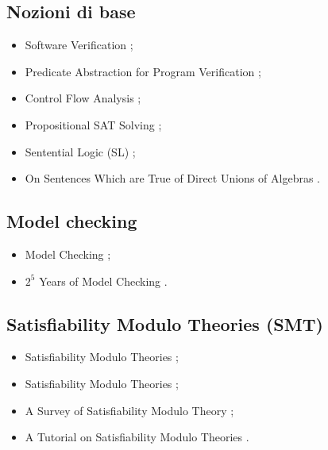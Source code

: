 \subsection*{Nozioni di base}
\begin{itemize}

\item Software Verification \cite{kroening2021softver};

\item Predicate Abstraction for Program Verification \cite{jhala2018predver};

\item Control Flow Analysis \cite{allen1970cfa};

\item Propositional SAT Solving \cite{marquessilva2018sat};

\item Sentential Logic (SL) \cite{polkowski2023sl};

\item On Sentences Which are True of Direct Unions of Algebras \cite{horn1951clause}.

\end{itemize}

\subsection*{Model checking}
\begin{itemize}

\item Model Checking \cite{clarke1997modelcheck};

\item $2^5$ Years of Model Checking \cite{clarke2014modelcheck}.

\end{itemize}

\subsection*{Satisfiability Modulo Theories (SMT)}
\begin{itemize}

\item Satisfiability Modulo Theories \cite{barrett2021smt};

\item Satisfiability Modulo Theories \cite{barrett2018smt};

\item A Survey of Satisfiability Modulo Theory \cite{monniaux2016smt};

\item A Tutorial on Satisfiability Modulo Theories \cite{demoura2007smt}.

\end{itemize}

